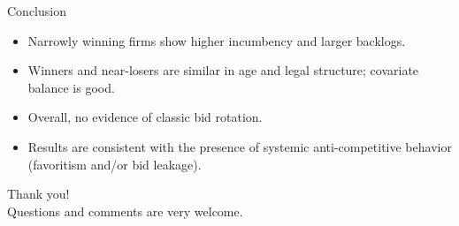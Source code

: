\documentclass[12pt,english,xcolor=dvipsnames,aspectratio=1610]{beamer}
\begin{document}
\begin{frame}{Conclusion}
  \begin{itemize}
    \item Narrowly winning firms show higher incumbency and larger backlogs.
    \item Winners and near-losers are similar in age and legal structure; covariate balance is good.
    \item Overall, no evidence of classic bid rotation.
    \item Results are consistent with the presence of systemic anti-competitive behavior (favoritism and/or bid leakage).
  \end{itemize}
\end{frame}

\begin{frame}
  \begin{center}
    \Huge Thank you! \\[8pt]
    \large Questions and comments are very welcome.
  \end{center}
\end{frame}

\begin{frame}
 
   
\end{frame}
\end{document}
